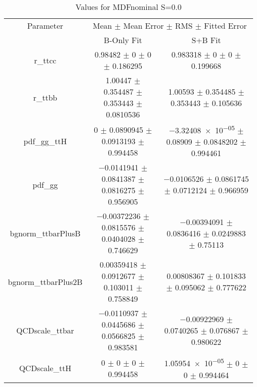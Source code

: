 \begin{table}
\centering
\caption{Values for MDFnominal S=0.0}
\begin{tabular}{ccc}
\toprule
Parameter & \multicolumn{2}{c}{Mean $\pm$ Mean Error $\pm$ RMS $\pm$ Fitted Error}\\
 & B-Only Fit & S+B Fit\\
\midrule
r\_ttcc & \num{0.98482} $\pm$ \num{0} $\pm$ \num{0} $\pm$ \num{0.186295} & \num{0.983318} $\pm$ \num{0} $\pm$ \num{0} $\pm$ \num{0.199668}\\
r\_ttbb & \num{1.00447} $\pm$ \num{0.354487} $\pm$ \num{0.353443} $\pm$ \num{0.0810536} & \num{1.00593} $\pm$ \num{0.354485} $\pm$ \num{0.353443} $\pm$ \num{0.105636}\\
pdf\_gg\_ttH & \num{0} $\pm$ \num{0.0890945} $\pm$ \num{0.0913193} $\pm$ \num{0.994458} & \num{-3.32408e-05} $\pm$ \num{0.08909} $\pm$ \num{0.0848202} $\pm$ \num{0.994461}\\
pdf\_gg & \num{-0.0141941} $\pm$ \num{0.0841387} $\pm$ \num{0.0816275} $\pm$ \num{0.956905} & \num{-0.0106526} $\pm$ \num{0.0861745} $\pm$ \num{0.0712124} $\pm$ \num{0.966959}\\
bgnorm\_ttbarPlusB & \num{-0.00372236} $\pm$ \num{0.0815576} $\pm$ \num{0.0404028} $\pm$ \num{0.746629} & \num{-0.00394091} $\pm$ \num{0.0836416} $\pm$ \num{0.0249883} $\pm$ \num{0.75113}\\
bgnorm\_ttbarPlus2B & \num{0.00359418} $\pm$ \num{0.0912677} $\pm$ \num{0.103011} $\pm$ \num{0.758849} & \num{0.00808367} $\pm$ \num{0.101833} $\pm$ \num{0.095062} $\pm$ \num{0.777622}\\
QCDscale\_ttbar & \num{-0.0110937} $\pm$ \num{0.0445686} $\pm$ \num{0.0566825} $\pm$ \num{0.983581} & \num{-0.00922969} $\pm$ \num{0.0740265} $\pm$ \num{0.076867} $\pm$ \num{0.980622}\\
QCDscale\_ttH & \num{0} $\pm$ \num{0} $\pm$ \num{0} $\pm$ \num{0.994458} & \num{1.05954e-05} $\pm$ \num{0} $\pm$ \num{0} $\pm$ \num{0.994464}\\
\bottomrule
\end{tabular}
\end{table}